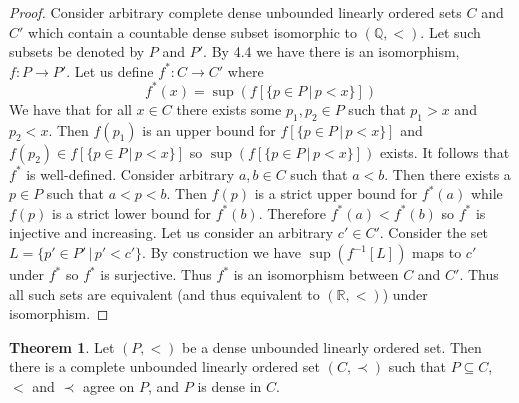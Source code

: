\documentclass{article}
\theoremstyle{definition}
\newtheorem{thm}{Theorem}[section]
\newcommand{\Q}{\mathbb{Q}}
\newcommand{\R}{\mathbb{R}}
\begin{document}
\begin{proof}
    Consider arbitrary complete dense unbounded linearly ordered sets $C$ and $C'$ which contain a countable dense subset isomorphic to $(\Q, <)$. Let such subsets be denoted by $P$ and $P'$. By 4.4 we have there is an isomorphism, $f: P \to P'$. Let us define $f^*: C \to C'$ where 
    \[
        f^*(x) = \sup(f[\{p \in P \, | \, p < x\}])    
    \]
    We have that for all $x \in C$ there exists some $p_1, p_2 \in P$ such that $p_1 > x$ and $p_2 < x$. Then $f(p_1)$ is an upper bound for $f[\{p \in P \, | \, p < x\}]$ and $f(p_2) \in f[\{p \in P \, | \, p < x\}]$ so $\sup(f[\{p \in P \, | \, p < x\}])$ exists. It follows that $f^*$ is well-defined. Consider arbitrary $a, b \in C$ such that $a < b$. Then there exists a $p \in P$ such that $a < p < b$. Then $f(p)$ is a strict upper bound for $f^*(a)$ while $f(p)$ is a strict lower bound for $f^*(b)$. Therefore $f^*(a) < f^*(b)$ so $f^*$ is injective and increasing. Let us consider an arbitrary $c' \in C'$. Consider the set $L = \{p' \in P' \, | \, p' < c'\}$. By construction we have $\sup(f^{-1}[L])$ maps to $c'$ under $f^*$ so $f^*$ is surjective. Thus $f^*$ is an isomorphism between $C$ and $C'$. Thus all such sets are equivalent (and thus equivalent to $(\R, <)$) under isomorphism.
\end{proof}

\begin{thm}
    Let $(P, <)$ be a dense unbounded linearly ordered set. Then  there is a complete unbounded linearly ordered set $(C, \prec)$ such that $P \subseteq C$, $<$ and $\prec$ agree on $P$, and $P$ is dense in $C$.
\end{thm}
\end{document}
